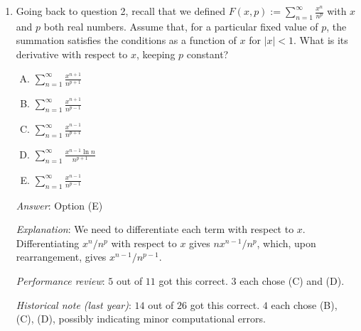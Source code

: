 \documentclass[10pt]{amsart}
\begin{document}
\begin{enumerate}
  {\em Answer}: Option (D)

  {\em Explanation}: We need to differentiate $(1/n)^p$ with respect
  to $p$. This is the same as differentiating $a^x$ with respect to
  $x$, which gives $a^x \ln a$. In our case, we get $(1/n)^p \ln(1/n)$
  which is $(-\ln n)/n^p$.

  Note that Option (A) arises if we try to differentiate formally with
  respect to $n$, which is not the correct operation at all. $n$ is a
  dummy variable and the expression should be differentiated with
  respect to $p$.

  {\em Performance review}: $3$ out of $11$ got this. $8$ chose
  (A). This indicates that many people differentiated with respect to
  the wrong variable.

  {\em Historical note (last year)}: $8$ out of $26$ people got this
  correct. $13$ chose (A), $3$ chose (B), $1$ chose (C), and $1$ left
  the question blank. The most commonly chosen wrong option, (A),
  indicates that many people differentiated with respect to the wrong
  variable.

\item Going back to question 2, recall that we defined $F(x,p) :=
  \sum_{n=1}^\infty \frac{x^n}{n^p}$ with $x$ and $p$ both real
  numbers. Assume that, for a particular fixed value of $p$, the
  summation satisfies the conditions as a function of $x$ for $|x| <
  1$. What is its derivative with respect to $x$, keeping $p$
  constant?
  \begin{enumerate}[(A)]
  \item $\sum_{n=1}^\infty \frac{x^{n+1}}{n^{p+1}}$
  \item $\sum_{n=1}^\infty \frac{x^{n+1}}{n^{p-1}}$
  \item $\sum_{n=1}^\infty \frac{x^{n-1}}{n^{p+1}}$
  \item $\sum_{n=1}^\infty \frac{x^{n-1}\ln n}{n^{p+1}}$
  \item $\sum_{n=1}^\infty \frac{x^{n-1}}{n^{p-1}}$
  \end{enumerate}

  {\em Answer}: Option (E)

  {\em Explanation}: We need to differentiate each term with respect
  to $x$. Differentiating $x^n/n^p$ with respect to $x$ gives
  $nx^{n-1}/n^p$, which, upon rearrangement, gives $x^{n-1}/n^{p-1}$.

  {\em Performance review}: $5$ out of $11$ got this correct. $3$ each
  chose (C) and (D).

 {\em Historical note (last year)}: $14$ out of $26$ got this
  correct. $4$ each chose (B), (C), (D), possibly indicating minor
  computational errors.


\end{enumerate}
\end{document}
